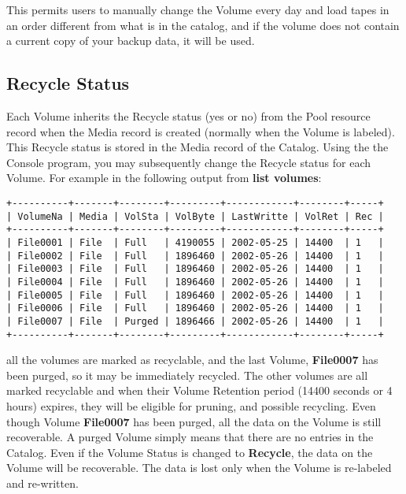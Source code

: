 This permits users to manually change the Volume every day and load tapes in
an order different from what is in the catalog, and if the volume does not
contain a current copy of your backup data, it will be used. 

\subsection*{Recycle Status}

Each Volume inherits the Recycle status (yes or no) from the Pool resource
record when the Media record is created (normally when the Volume is labeled).
This Recycle status is stored in the Media record of the Catalog. Using the
the Console program, you may subsequently change the Recycle status for each
Volume. For example in the following output from {\bf list volumes}: 

\footnotesize
\begin{verbatim}
+----------+-------+--------+---------+------------+--------+-----+
| VolumeNa | Media | VolSta | VolByte | LastWritte | VolRet | Rec |
+----------+-------+--------+---------+------------+--------+-----+
| File0001 | File  | Full   | 4190055 | 2002-05-25 | 14400  | 1   |
| File0002 | File  | Full   | 1896460 | 2002-05-26 | 14400  | 1   |
| File0003 | File  | Full   | 1896460 | 2002-05-26 | 14400  | 1   |
| File0004 | File  | Full   | 1896460 | 2002-05-26 | 14400  | 1   |
| File0005 | File  | Full   | 1896460 | 2002-05-26 | 14400  | 1   |
| File0006 | File  | Full   | 1896460 | 2002-05-26 | 14400  | 1   |
| File0007 | File  | Purged | 1896466 | 2002-05-26 | 14400  | 1   |
+----------+-------+--------+---------+------------+--------+-----+
\end{verbatim}
\normalsize

all the volumes are marked as recyclable, and the last Volume, {\bf File0007}
has been purged, so it may be immediately recycled. The other volumes are all
marked recyclable and when their Volume Retention period (14400 seconds or 4
hours) expires, they will be eligible for pruning, and possible recycling.
Even though Volume {\bf File0007} has been purged, all the data on the Volume
is still recoverable. A purged Volume simply means that there are no entries
in the Catalog. Even if the Volume Status is changed to {\bf Recycle}, the
data on the Volume will be recoverable. The data is lost only when the Volume
is re-labeled and re-written. 

